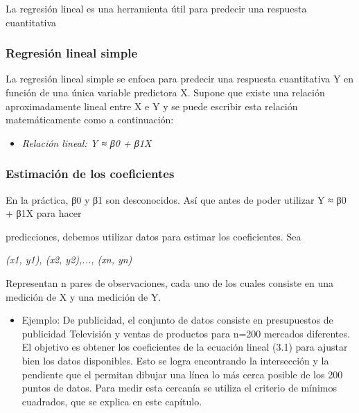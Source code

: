 \documentclass[
  letterpaper,
  DIV=11,
  numbers=noendperiod]{scrartcl}
\providecommand{\tightlist}{%
  \setlength{\itemsep}{0pt}\setlength{\parskip}{0pt}}\usepackage{longtable,booktabs,array}
\begin{document}
La regresión lineal es una herramienta útil para predecir una respuesta
cuantitativa

\hypertarget{regresiuxf3n-lineal-simple}{%
\subsubsection{\texorpdfstring{\textbf{Regresión lineal
simple}}{Regresión lineal simple}}\label{regresiuxf3n-lineal-simple}}

La regresión lineal simple se enfoca para predecir una respuesta
cuantitativa Y en función de una única variable predictora X. Supone que
existe una relación aproximadamente lineal entre X e Y y se puede
escribir esta relación matemáticamente como a continuación:

\begin{itemize}
\tightlist
\item
  \emph{Relación lineal: Y ≈ β0 + β1X}
\end{itemize}

\hypertarget{estimaciuxf3n-de-los-coeficientes}{%
\subsubsection{\texorpdfstring{\textbf{Estimación de los
coeficientes}}{Estimación de los coeficientes}}\label{estimaciuxf3n-de-los-coeficientes}}

En la práctica, β0 y β1 son desconocidos. Así que antes de poder
utilizar Y ≈ β0 + β1X para hacer

predicciones, debemos utilizar datos para estimar los coeficientes. Sea

\emph{(x1, y1), (x2, y2),..., (xn, yn)}

Representan n pares de observaciones, cada uno de los cuales consiste en
una medición de X y una medición de Y.

\begin{itemize}
\tightlist
\item
  Ejemplo: De publicidad, el conjunto de datos consiste en presupuestos
  de publicidad Televisión y ventas de productos para n=200 mercados
  diferentes. El objetivo es obtener los coeficientes de la ecuación
  lineal (3.1) para ajustar bien los datos disponibles. Esto se logra
  encontrando la intersección y la pendiente que el permitan dibujar una
  línea lo más cerca posible de los 200 puntos de datos. Para medir esta
  cercanía se utiliza el criterio de mínimos cuadrados, que se explica
  en este capítulo.
\end{itemize}
\end{document}
